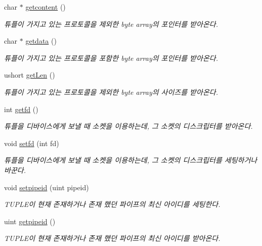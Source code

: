 \begin{DoxyCompactItemize}
char $\ast$ \hyperlink{classTUPLE_a92c2046bfd6da6f0cfee98f3eb79a16b}{getcontent} ()
\begin{DoxyCompactList}\small\item\em 튜플이 가지고 있는 프로토콜을 제외한 byte array의 포인터를 받아온다. \end{DoxyCompactList}\item 
char $\ast$ \hyperlink{classTUPLE_aee1504a1fcdc572c7882a3a2bfdb68c1}{getdata} ()
\begin{DoxyCompactList}\small\item\em 튜플이 가지고 있는 프로토콜을 포함한 byte array의 포인터를 받아온다. \end{DoxyCompactList}\item 
ushort \hyperlink{classTUPLE_ab76925f0b573319312d68b99b01c430b}{get\+Len} ()
\begin{DoxyCompactList}\small\item\em 튜플이 가지고 있는 프로토콜을 제외한 byte array의 사이즈를 받아온다. \end{DoxyCompactList}\item 
int \hyperlink{classTUPLE_aceaeef41e02218844ec771742ce58cb8}{getfd} ()
\begin{DoxyCompactList}\small\item\em 튜플을 디바이스에게 보낼 때 소켓을 이용하는데, 그 소켓의 디스크립터를 받아온다. \end{DoxyCompactList}\item 
void \hyperlink{classTUPLE_af8d5f46162486df038818d8dc70dcc49}{setfd} (int fd)
\begin{DoxyCompactList}\small\item\em 튜플을 디바이스에게 보낼 때 소켓을 이용하는데, 그 소켓의 디스크립터를 세팅하거나 바꾼다. \end{DoxyCompactList}\item 
void \hyperlink{classTUPLE_acd1a1ae03890b2c6a732357b353c31a0}{setpipeid} (uint pipeid)
\begin{DoxyCompactList}\small\item\em T\+U\+P\+L\+E이 현재 존재하거나 존재 했던 파이프의 최신 아이디를 세팅한다. \end{DoxyCompactList}\item 
uint \hyperlink{classTUPLE_aa9626dd889eecbc754ed339edd4adefc}{getpipeid} ()
\begin{DoxyCompactList}\small\item\em T\+U\+P\+L\+E이 현재 존재하거나 존재 했던 파이프의 최신 아이디를 받아온다. \end{DoxyCompactList}\item 

\end{DoxyCompactItemize}
